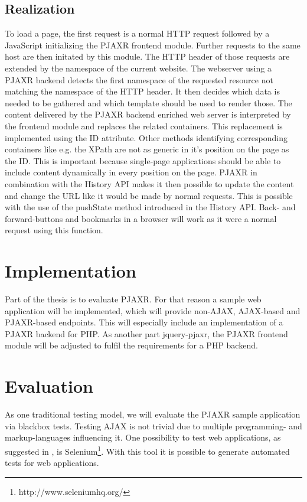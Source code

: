 \documentclass[f,bachelor,binding,twoside,palatino]{WeSTthesis}
\def \ajax {AJAX}
\def \pjaxr {PJAXR}
\def \jqueryPjaxr {jquery-pjaxr}
\def \httpRequest {HTTP request}
\def \singlePageApplication {single-page application}
\begin{document}
  \subsection{Realization}
  To load a page, the first request is a normal \httpRequest{} followed by a JavaScript initializing the \pjaxr{} frontend module.
  Further requests to the same host are then initated by this module.
  The HTTP header of those requests are extended by the namespace of the current website.
  The webserver using a \pjaxr{} backend detects the first namespace of the requested resource not matching the namespace of the HTTP header.
  It then decides which data is needed to be gathered and which template should be used to render those.
  The content delivered by the \pjaxr{} backend enriched web server is interpreted by the frontend module and replaces the related containers.
  This replacement is implemented using the ID attribute.
  Other methods identifying corresponding containers like e.g. the XPath are not as generic in it's position on the page as the ID.
  This is important because \singlePageApplication{}s should be able to include content dynamically in every position on the page.
  \pjaxr{} in combination with the History API makes it then possible to update the content and change the URL like it would be made by normal requests.
  This is possible with the use of the pushState method introduced in the History API.
  Back- and forward-buttons and bookmarks in a browser will work as it were a normal request using this function.
  
\section{Implementation}
  Part of the thesis is to evaluate \pjaxr{}. For that reason a sample web application will be implemented, which will provide non-\ajax{}, \ajax{}-based and \pjaxr{}-based endpoints.
  This will especially include an implementation of a \pjaxr{} backend for PHP. As another part \jqueryPjaxr{}, the \pjaxr{} frontend module will be adjusted to fulfil the requirements for a PHP backend.

\section{Evaluation}
  As one traditional testing model, we will evaluate the \pjaxr{} sample application via blackbox tests.
  Testing \ajax{} is not trivial due to multiple programming- and markup-languages influencing it. 
  One possibility to test web applications, as suggested in \cite{lundmark11}, is Selenium\footnote{http://www.seleniumhq.org/}.
  With this tool it is possible to generate automated tests for web applications.
\end{document}
